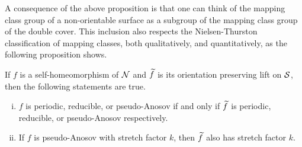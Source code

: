 A consequence of the above proposition is that one can think of the mapping class group of a non-orientable surface
as a subgroup of the mapping class group of the double cover. This inclusion also respects the Nielsen-Thurston
classification of mapping classes, both qualitatively, and quantitatively, as the following proposition shows.
\begin{prop}
  \label{prop:2}
  If $f$ is a self-homeomorphism of $\mathcal{N}$ and $\widetilde{f}$ is its orientation preserving lift on $\mathcal{S}$, then
  the following statements are true.
  \begin{enumerate}[(i)]
  \item $f$ is periodic, reducible, or pseudo-Anosov if and only if $\widetilde{f}$ is periodic, reducible, or pseudo-Anosov
    respectively.
  \item If $f$ is pseudo-Anosov with stretch factor $k$, then $\widetilde{f}$ also has stretch factor $k$.
  \end{enumerate}
\end{prop}
